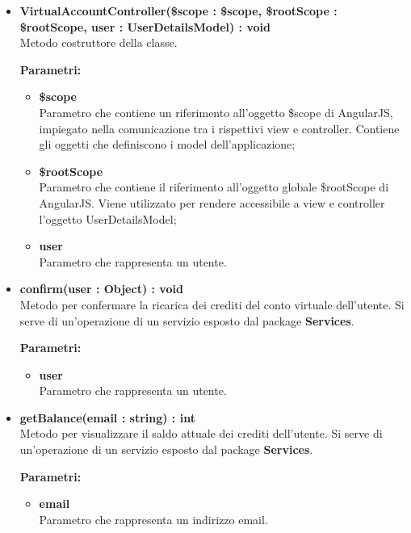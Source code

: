 \begin{itemize}
\begin{itemize}
			\item \textbf{VirtualAccountController(\$scope : \$scope, \$rootScope : \$rootScope, user : UserDetailsModel) : void}\\
			Metodo costruttore della classe.
			\begin{description}
    			\item[\textbf{Parametri:}]
			\end{description}
			\begin{itemize}
				\item \textbf{\$scope}\\
				Parametro che contiene un riferimento all'oggetto \$scope di AngularJS, impiegato nella comunicazione tra i rispettivi view e controller. Contiene gli oggetti che definiscono i model dell'applicazione;
				
				\item \textbf{\$rootScope}\\
				Parametro che contiene il riferimento all'oggetto globale \$rootScope di AngularJS. Viene utilizzato per rendere accessibile a view e controller l'oggetto UserDetailsModel;
				
				\item \textbf{user}\\
				Parametro che rappresenta un utente.
			\end{itemize}
			
			\item \textbf{confirm(user : Object) : void}\\
			Metodo per confermare la ricarica dei crediti del conto virtuale dell'utente. Si serve di un'operazione di un servizio esposto dal package \textbf{Services}.
			\begin{description}
    			\item[\textbf{Parametri:}]
			\end{description}
			\begin{itemize}
				\item \textbf{user}\\
				Parametro che rappresenta un utente.
			\end{itemize}
			
			\item \textbf{getBalance(email : string) : int}\\
			Metodo per visualizzare il saldo attuale dei crediti dell'utente. Si serve di un'operazione di un servizio esposto dal package \textbf{Services}.
			\begin{description}
    			\item[\textbf{Parametri:}]
			\end{description}
			\begin{itemize}
				\item \textbf{email}\\
				Parametro che rappresenta un indirizzo email.
			\end{itemize}
			

\end{itemize}
\end{itemize}
